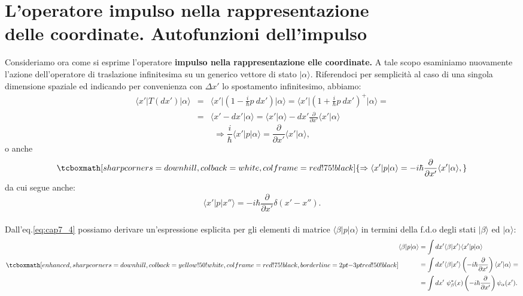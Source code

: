 \documentclass[a4paper,12pt,oneside]{book}
\begin{document}
\section[L'operatore impulso nella rappresentazione delle coordinate. Autofunzioni dell'impulso]{L'operatore impulso nella rappresentazione \\delle coordinate. Autofunzioni dell'impulso}
Consideriamo ora come si esprime l'operatore \textbf{impulso nella rappresentazione elle coordinate.} A tale scopo esaminiamo nuovamente l'azione dell'operatore di traslazione infinitesima su un generico vettore di stato $\vert \alpha \rangle$. Riferendoci per semplicità al caso di una singola dimensione spaziale ed indicando per convenienza con $\Delta x'$ lo spostamento infinitesimo, abbiamo:
	\begin{eqnarray}
		\langle x' \vert T(dx') \vert \alpha \rangle 
		& = & \langle x' \vert \left(1-\frac{i}{\hbar}p\ dx'\right) \vert \alpha \rangle = \langle x' \vert \left(1+\frac{i}{\hbar}p\ dx'\right) ^+ \vert \alpha \rangle = \nonumber \\
		& = & \langle x'-dx'\vert \alpha \rangle = \langle x'\vert \alpha \rangle  - dx' \frac{\partial}{\partial x'} \langle x'\vert \alpha \rangle 
	\end{eqnarray}
	\begin{equation}
		 \Rightarrow \frac{i}{\hbar}\langle x'\vert p \vert \alpha \rangle = \frac{\partial}{\partial x'}\langle x'\vert \alpha \rangle ,
	\end{equation}
o anche
	\begin{equation}
		\label{eq:cap7_4}
		\tcboxmath[sharp corners=downhill ,colback=white,colframe=red!75!black]{
			\Rightarrow \langle x'\vert p \vert \alpha \rangle =-i\hbar\frac{\partial}{\partial x'}\langle x'\vert \alpha \rangle ,
			}
	\end{equation}
da cui segue anche:
	\begin{equation}
		\langle x'\vert p \vert x'' \rangle =-i\hbar\frac{\partial}{\partial x'}\delta (x'-x'').
	\end{equation}\\
	
Dall'eq.\eqref{eq:cap7_4} possiamo derivare un'espressione esplicita per gli elementi di matrice $\langle \beta \vert p\vert \alpha \rangle $ in termini della f.d.o degli stati $\vert \beta \rangle $ ed $\vert \alpha \rangle $:
	\begin{equation}
		\label{eq:cap7_5}
		\tcboxmath[enhanced,sharp corners=downhill ,colback=yellow!50!white,colframe=red!75!black, borderline={2pt}{-3pt}{red!50!black}]{
		\begin{aligned}
			\langle \beta \vert p \vert \alpha \rangle &= \int dx' \langle \beta \vert x' \rangle \langle x' \vert p \vert \alpha \rangle\\ &= \int dx' 	\langle \beta \vert x' \rangle \left( -i\hbar \frac{\partial}{\partial x'}\right) \langle x' \vert \alpha \rangle = \\
& = \int dx' \ \psi _{\beta} ^* (x) \left( -i\hbar \frac{\partial}{\partial x'}\right) \psi _{\alpha}  (x') .
		\end{aligned}
		}
	\end{equation}\\
	
\end{document}
